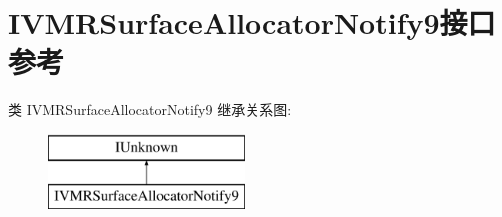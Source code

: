 \hypertarget{interface_i_v_m_r_surface_allocator_notify9}{}\section{I\+V\+M\+R\+Surface\+Allocator\+Notify9接口 参考}
\label{interface_i_v_m_r_surface_allocator_notify9}
类 I\+V\+M\+R\+Surface\+Allocator\+Notify9 继承关系图\+:\begin{figure}[H]
\begin{center}
\leavevmode
\includegraphics[height=2.000000cm]{interface_i_v_m_r_surface_allocator_notify9}
\end{center}
\end{figure}
